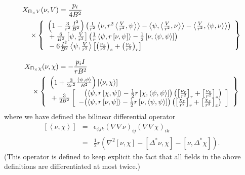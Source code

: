 \documentclass[letterpaper]{book}
\newcommand{\tensor}[1]{\mathsf{#1}}
\renewcommand{\P}{\tensor{\Pi}}
\newcommand{\grad}[1]{\nabla #1}
\newcommand{\gs}[1]{\Delta^* #1}
\newcommand{\lp}[1]{\nabla^2 #1}
\newcommand{\pb}[2]{\left[#1,#2\right]}
\newcommand{\ip}[2]{\left\langle  #1,#2\right\rangle}
\newcommand{\funcsa}[2]{\left[\left\langle #1,#2 \right\rangle\right]}
\begin{document}
\begin{eqnarray*}
  & \lefteqn{X_{\P_\times V}(\nu, V) = \frac{p_i}{4 B^2}} &
  \\ && \mbox{} \times 
  \left\{ \begin{array}{l}
    \left(1 - \frac{3}{r^2} \frac{I^2}{B^2} \right) \left(
    \frac{1}{r^2} \ip{\nu}{r^2\ip{\frac{V}{r^2}}{\psi}}
    - \ip{\psi}{\ip{\frac{V}{r^2}}{\nu}}
    - \ip{\frac{V}{r^2}}{\ip{\psi}{\nu}} \right)
    \\ \mbox{} + \frac{6}{B^2} \pb{\psi}{\frac{V}{r^2}}
    \left(\frac{1}{r} \ip{\psi}{r \pb{\nu}{\psi}}
    - \frac{1}{2} \pb{\nu}{\ip{\psi}{\psi}} \right)
    \\ \mbox{} - 6 \frac{I^2}{B^2} \ip{\psi}{\frac{V}{r^2}}
    \left[ \left(\frac{\nu_z}{r^2} \right)_z
         + \left(\frac{\nu_r}{r^2} \right)_r \right]
  \end{array} \right\}
\end{eqnarray*}


\begin{eqnarray*}
  & \lefteqn{X_{\P_\times \chi}(\nu, \chi) = -\frac{p_i I}{r B^2}} &
  \\ && \mbox{} \times 
  \left\{ \begin{array}{l}
    \left(1 + \frac{3}{2 r^2} \frac{\ip{\psi}{\psi}}{B^2} \right)
    \funcsa{\nu}{\chi}
    \\ \mbox{} + \frac{3}{2 B^2} \left[ \begin{array}{r@{}l}
      & \left(\ip{\psi}{r\pb{\chi}{\psi}} 
            - \frac{1}{2} r \pb{\chi}{\ip{\psi}{\psi}} \right)
	\left( \left[ \frac{\nu_r}{r^2} \right]_r
	     + \left[ \frac{\nu_z}{r^2} \right]_z \right)
    \\ \mbox{}
     - & \left(\ip{\psi}{r\pb{\nu}{\psi}} 
             - \frac{1}{2} r \pb{\nu}{\ip{\psi}{\psi}} \right)
         \left( \left[ \frac{\chi_r}{r^2} \right]_r
	      + \left[ \frac{\chi_z}{r^2} \right]_z \right)
      \end{array} \right]
  \end{array} \right\}
\end{eqnarray*}
where we have defined the bilinear differential operator
\begin{eqnarray*}
  \funcsa{\nu}{\chi} 
  & = & \epsilon_{\phi j k} (\grad{\grad{\nu}})_{i j}
                            (\grad{\grad{\chi}})_{i k}\\
  & = & \frac{1}{2} r \left(\lp{\pb{\nu}{\chi}} 
  - \pb{\gs{\nu}}{\chi} - \pb{\nu}{\gs{\chi}} \right).
\end{eqnarray*}
(This operator is defined to keep explicit the fact that all fields in the
above definitions are differentiated at most twice.)
\end{document}
